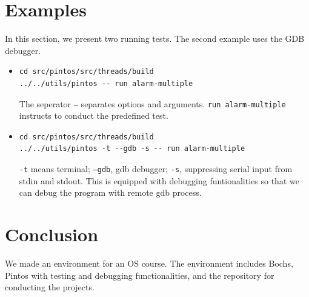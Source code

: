\documentclass[a4paper,article,11pt,oneside]{article}
\begin{document}
\section{Examples}\label{secexample}
In this section, we present two running tests. The second example uses
the GDB debugger.
\begin{itemize}
\item
\begin{verbatim}
cd src/pintos/src/threads/build
../../utils/pintos -- run alarm-multiple
\end{verbatim}
The seperator \texttt{--} separates options and arguments. \texttt{run
  alarm-multiple} instructs to conduct the predefined test.

\item
\begin{verbatim}
cd src/pintos/src/threads/build
../../utils/pintos -t --gdb -s -- run alarm-multiple
\end{verbatim}
\texttt{-t} means terminal; \texttt{--gdb}, gdb debugger; \texttt{-s},
suppressing serial input from stdin and stdout. This is equipped with
debugging funtionalities so that we can debug the program with remote
gdb process.

\end{itemize}

\section{Conclusion}
We made an environment for an OS course. The environment includes
Bochs, Pintos with testing and debugging functionalities, and the
repository for conducting the projects.



\end{document}
